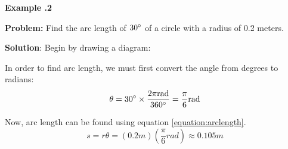 \newpage

  \begin{mdframed}[backgroundcolor=blue!10!white]
	\begin{center}	
		\textbf{Example \thesection.2}	
	\end{center}
	
	\textbf{Problem:} Find the arc length of $30\degree$ of a circle with a radius of 0.2 meters.  
	 
	
	\vspace{0.2 in} 
	\textbf{Solution}: Begin by drawing a diagram:
	
	
	 	  \begin{center}
	\end{center}

	In order to find arc length, we must first convert the angle from degrees to radians:
	\begin{equation*}
	\theta = 30 \degree \times \frac{2 \pi \si{rad}} {360 \degree} = \frac{\pi}{6} \si{rad}
	\end{equation*}
	
	Now, arc length can be found using equation \ref{equation:arclength}.
	\begin{equation*}
		s = r \theta = (0.2 \si{m})(\frac{\pi}{6} \si{rad}) \approx 0.105 \si{m}
	\end{equation*}
	
	
\end{mdframed}
  